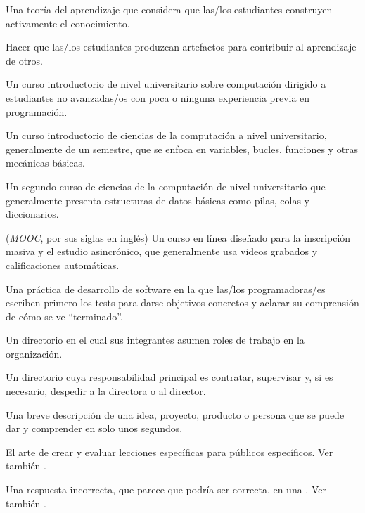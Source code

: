 \begin{description}
 Una teoría del aprendizaje que considera que
las/los estudiantes construyen activamente el conocimiento.

 Hacer que las/los estudiantes
produzcan artefactos para contribuir al aprendizaje de otros.

 Un curso introductorio de nivel universitario sobre computación
dirigido a estudiantes no avanzadas/os con poca o ninguna experiencia previa en programación.

 Un curso introductorio de ciencias de la computación a nivel universitario,
generalmente de un semestre, que se enfoca en variables, bucles, funciones y otras mecánicas básicas.

 Un segundo curso de ciencias de la computación de nivel universitario
que generalmente presenta estructuras de datos básicas como pilas, colas y diccionarios.

 (\emph{MOOC}, por sus siglas en inglés) Un curso en línea diseñado para la inscripción masiva y el estudio asincrónico, que generalmente usa videos grabados y calificaciones automáticas.

 Una práctica de desarrollo
de software en la que las/los programadoras/es escriben primero los tests
para darse objetivos concretos y aclarar su comprensión de cómo se ve ``terminado''.

 Un directorio en el cual sus integrantes asumen roles de trabajo en la organización.

 Un directorio cuya responsabilidad principal es
contratar, supervisar y, si es necesario, despedir a la directora o al director.

 Una breve descripción de una idea,
proyecto, producto o persona que se puede dar y comprender en solo unos segundos.

 El arte de crear y evaluar
lecciones específicas para públicos específicos. Ver también
.

 Una respuesta incorrecta, que parece que podría ser correcta, 
en una . Ver también
.


\end{description}
